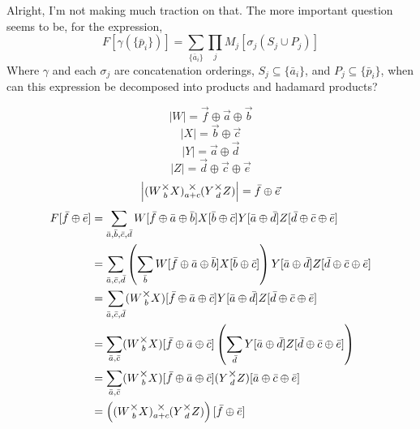\documentclass[12pt]{book}
\theoremstyle{plain}
\theoremstyle{definition}
\theoremstyle{ppart}
\theoremstyle{case}
\theoremstyle{solution}
\newcommand{\mmult}[1]{\text{\raisebox{1ex}{$\underset{#1}{\times}$}}}
\newcommand{\shape}[1]{\left|#1\right|}
\begin{document}
\begin{appendices}
\begin{landscape}
\pagebreak

Alright, I'm not making much traction on that. The more important question seems to be, for the expression,
\[ F[\gamma(\{\bar{p}_i\})] = \sum_{\{\bar{a}_i\}} \prod_j M_j[\sigma_j(S_j \cup P_j)] \]
Where $\gamma$ and each $\sigma_j$ are concatenation orderings, $S_j \subseteq \{\bar{a}_i\}$, and $P_j \subseteq \{\bar{p}_i\}$,
when can this expression be decomposed into products and hadamard products?

\[ \shape{W} = \vec{f} \oplus \vec{a} \oplus \vec{b} \]
\[ \shape{X} = \vec{b} \oplus \vec{c} \]
\[ \shape{Y} = \vec{a} \oplus \vec{d} \]
\[ \shape{Z} = \vec{d} \oplus \vec{c} \oplus \vec{e} \]
\[ \shape{(W \mmult{b} X) \mmult{a+c} (Y \mmult{d} Z)} = \bar{f} \oplus \vec{e} \]
\begin{align*}
  F[\bar{f} \oplus \bar{e}]
  &=
  \sum_{\bar{a}, \bar{b}, \bar{c}, \bar{d}}
  W[\bar{f} \oplus \bar{a} \oplus \bar{b}]
  X[\bar{b} \oplus \bar{c}]
  Y[\bar{a} \oplus \bar{d}]
  Z[\bar{d} \oplus \bar{c} \oplus \bar{e}] \\
  &=
  \sum_{\bar{a}, \bar{c}, \bar{d}}
  \left(
    \sum_{\bar{b}}
    W[\bar{f} \oplus \bar{a} \oplus \bar{b}]
    X[\bar{b} \oplus \bar{c}]
  \right)
  Y[\bar{a} \oplus \bar{d}]
  Z[\bar{d} \oplus \bar{c} \oplus \bar{e}] \\
  &=
  \sum_{\bar{a}, \bar{c}, \bar{d}}
  (W \mmult{b} X)[\bar{f} \oplus \bar{a} \oplus \bar{c}]
  Y[\bar{a} \oplus \bar{d}]
  Z[\bar{d} \oplus \bar{c} \oplus \bar{e}] \\
  &=
  \sum_{\bar{a}, \bar{c}}
  (W \mmult{b} X)[\bar{f} \oplus \bar{a} \oplus \bar{c}]
  \left(
    \sum_{\bar{d}}
    Y[\bar{a} \oplus \bar{d}]
    Z[\bar{d} \oplus \bar{c} \oplus \bar{e}]
  \right) \\
  &=
  \sum_{\bar{a}, \bar{c}}
  (W \mmult{b} X)[\bar{f} \oplus \bar{a} \oplus \bar{c}]
  (Y \mmult{d} Z)[\bar{a} \oplus \bar{c} \oplus \bar{e}] \\
  &=
  \left((W \mmult{b} X) \mmult{a+c} (Y \mmult{d} Z)\right)[\bar{f} \oplus \bar{e}]
\end{align*}

\pagebreak


\end{landscape}
\end{appendices}
\end{document}
